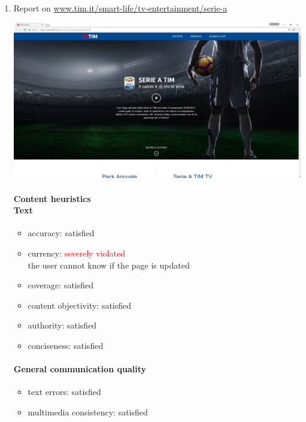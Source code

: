 \begin{enumerate}

\item Report on \url{www.tim.it/smart-life/tv-entertainment/serie-a}

\begin{center}
	\includegraphics[width=\textwidth]{Screenshot/seriea.jpg}
\end{center}
\vspace{1cm}

	\paragraph*{Content heuristics \\ Text}
	\begin{itemize}
		\item accuracy: satisfied
		\item currency:  \textcolor{red}{severely violated}\\
		the user cannot know if the page is updated
		\item coverage: satisfied
		\item content objectivity: satisfied
		\item authority: satisfied
		\item conciseness: satisfied		
	\end{itemize}

	\paragraph*{General communication quality}
	\begin{itemize}
		\item text errors: satisfied
		\item multimedia consistency: satisfied
	\end{itemize}


\end{enumerate}
